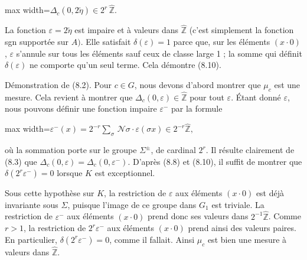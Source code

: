 \documentclass[11pt]{article}
\newcommand{\DFormula}[1]{\par\smallskip\noindent\begin{adjustbox}{max width=\linewidth}$\displaystyle #1$\end{adjustbox}\par\smallskip}
\begin{document}
\DFormula{\Delta _{c}(0,2\widetilde{\eta })\in 2^{r}\,\widehat{\mathbb{Z}}.}
\par
La fonction \(\varepsilon =2\widetilde{\eta }\) est impaire et à valeurs dans \(\widehat{\mathbb{Z}}\) (c’est simplement la fonction sgn supportée sur \(A)\). Elle satisfait \(\delta (\varepsilon )=1\) parce que, sur les éléments \((x\cdot 0)\), \(\varepsilon \) s’annule sur tous les éléments sauf ceux de classe large 1 ; la somme qui définit \(\delta (\varepsilon )\) ne comporte qu’un seul terme. Cela démontre (8.10).\par
\par
Démonstration de (8.2). Pour \(c\in G\), nous devons d’abord montrer que \(\mu _{c}\) est une mesure. Cela revient à montrer que \(\Delta _{c}(0,\varepsilon )\in \widehat{\mathbb{Z}}\) pour tout \(\varepsilon \). Étant donné \(\varepsilon \), nous pouvons définir une fonction impaire \(\varepsilon ^{-}\) par la formule\par
\par
\DFormula{\varepsilon ^{-}(x)=2^{-r}\sum _{\sigma }\,\mathcal{N}\sigma \cdot \varepsilon (\sigma x)\in 2^{-r}\widehat{\mathbb{Z}},}
\par
où la sommation porte sur le groupe \(\Sigma ^{\pm }\), de cardinal \(2^{r}\). Il résulte clairement de (8.3) que \(\Delta _{c}(0,\varepsilon )=\Delta _{c}(0,\varepsilon ^{-})\). D’après (8.8) et (8.10), il suffit de montrer que \(\delta (2^{r}\varepsilon ^{-})=0\) lorsque \(K\) est exceptionnel.\par
\par
Sous cette hypothèse sur \(K\), la restriction de \(\varepsilon \) aux éléments \((x\cdot 0)\) est déjà invariante sous \(\Sigma \), puisque l’image de ce groupe dans \(G_{1}\) est triviale. La restriction de \(\varepsilon ^{-}\) aux éléments \((x\cdot 0)\) prend donc ses valeurs dans \(2^{-1}\widehat{\mathbb{Z}}\). Comme \(r>1\), la restriction de \(2^{r}\varepsilon ^{-}\) aux éléments \((x\cdot 0)\) prend ainsi des valeurs paires. En particulier, \(\delta (2^{r}\varepsilon ^{-})=0\), comme il fallait. Ainsi \(\mu _{c}\) est bien une mesure à valeurs dans \(\widehat{\mathbb{Z}}\).\par
\par
\end{document}
